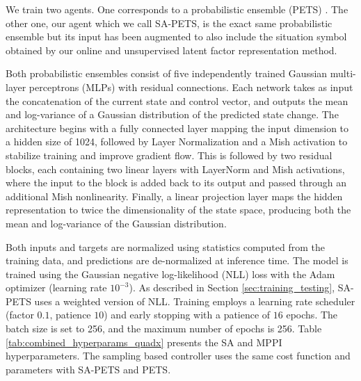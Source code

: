 \documentclass[Afour,sageh,times]{sagej}
\theoremstyle{lemma}
\begin{document}
We train two agents. One corresponds to a probabilistic ensemble (PETS) \cite[]{chua2018deep}. The other one, our agent which we call SA-PETS, is the exact same probabilistic ensemble but its input has been augmented to also include the situation symbol obtained by our online and unsupervised latent factor representation method.

Both probabilistic ensembles consist of five independently trained Gaussian multi-layer perceptrons (MLPs) with residual connections. Each network takes as input the concatenation of the current state and control vector, and outputs the mean and log-variance of a Gaussian distribution of the predicted state change. The architecture begins with a fully connected layer mapping the input dimension to a hidden size of 1024, followed by Layer Normalization and a Mish activation to stabilize training and improve gradient flow. This is followed by two residual blocks, each containing two linear layers with LayerNorm and Mish activations, where the input to the block is added back to its output and passed through an additional Mish nonlinearity. Finally, a linear projection layer maps the hidden representation to twice the dimensionality of the state space, producing both the mean and log-variance of the Gaussian distribution.

Both inputs and targets are normalized using statistics computed from the training data, and predictions are de-normalized at inference time. The model is trained using the Gaussian negative log-likelihood (NLL) loss with the Adam optimizer (learning rate $10^{-3}$). As described in Section \ref{sec:training_testing}, SA-PETS uses a weighted version of NLL. Training employs a learning rate scheduler (factor $0.1$, patience $10$) and early stopping with a patience of $16$ epochs. The batch size is set to 256, and the maximum number of epochs is 256. Table \ref{tab:combined_hyperparams_quadx} presents the SA and MPPI hyperparameters. The sampling based controller uses the same cost function and parameters with SA-PETS and PETS.
\end{document}
